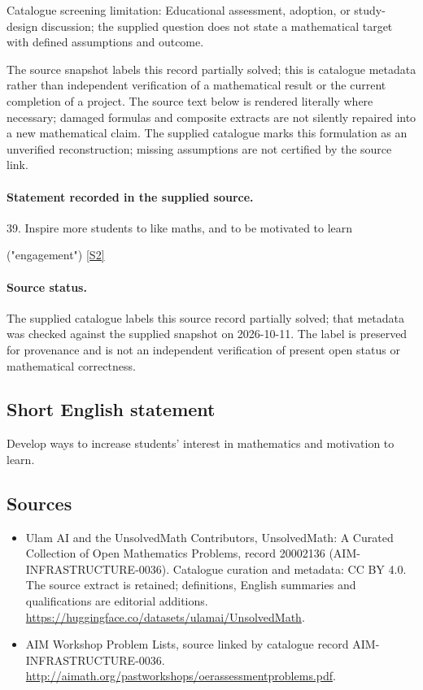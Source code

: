 \documentclass[11pt]{article}
\begin{document}
Catalogue screening limitation: Educational assessment, adoption, or study-design discussion; the supplied question does not state a mathematical target with defined assumptions and outcome.

The source snapshot labels this record partially solved; this is catalogue metadata rather than independent verification of a mathematical result or the current completion of a project.
The source text below is rendered literally where necessary; damaged formulas and composite extracts are not silently repaired into a new mathematical claim.
The supplied catalogue marks this formulation as an unverified reconstruction; missing assumptions are not certified by the source link.
\paragraph{Statement recorded in the supplied source.}
39. Inspire more students to like maths, and to be motivated to learn

("engagement") \href{http://aimath.org/pastworkshops/oerassessmentproblems.pdf}{[S2]}
\paragraph{Source status.}
The supplied catalogue labels this source record partially solved; that metadata was checked against the supplied snapshot on 2026-10-11. The label is preserved for provenance and is not an independent verification of present open status or mathematical correctness.
\subsection{Short English statement}
Develop ways to increase students' interest in mathematics and motivation to learn.
\subsection{Sources}
\begin{itemize}
\item[S1] Ulam AI and the UnsolvedMath Contributors, UnsolvedMath: A Curated Collection of Open Mathematics Problems, record 20002136 (AIM-INFRASTRUCTURE-0036). Catalogue curation and metadata: CC BY 4.0. The source extract is retained; definitions, English summaries and qualifications are editorial additions.
\url{https://huggingface.co/datasets/ulamai/UnsolvedMath}.
\item[S2] AIM Workshop Problem Lists, source linked by catalogue record AIM-INFRASTRUCTURE-0036.
\url{http://aimath.org/pastworkshops/oerassessmentproblems.pdf}.
\end{itemize}
\end{document}
